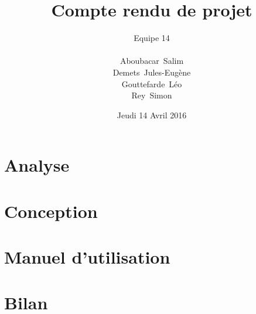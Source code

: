 \documentclass[a4paper, 11pt, titlepage]{article}
\title {{ {\huge Compte rendu de projet }} }
\author{\Large Equipe 14 \\
\\
    {\sc Aboubacar}~Salim\\
    {\sc Demets}~Jules-Eugène\\
    {\sc Gouttefarde}~Léo\\
    {\sc Rey}~Simon
}
\date{Jeudi 14 Avril 2016}
\begin{document}
\pagestyle{fancy}
\maketitle

\tableofcontents
\newpage


\section {Analyse}




\section {Conception}



\section {Manuel d'utilisation}




\section {Bilan}
\end{document}
